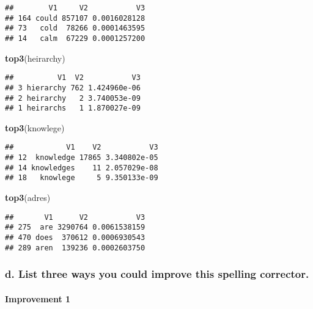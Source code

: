 \documentclass[]{article}
\newenvironment{Shaded}{\begin{snugshade}}{\end{snugshade}}
\newcommand{\KeywordTok}[1]{\textcolor[rgb]{0.13,0.29,0.53}{\textbf{#1}}}
\newcommand{\NormalTok}[1]{#1}
\let\oldparagraph\paragraph
\renewcommand{\paragraph}[1]{\oldparagraph{#1}\mbox{}}
\begin{document}
\begin{verbatim}
##        V1     V2           V3
## 164 could 857107 0.0016028128
## 73   cold  78266 0.0001463595
## 14   calm  67229 0.0001257200
\end{verbatim}

\begin{Shaded}
\begin{Highlighting}[]
\KeywordTok{top3}\NormalTok{(heirarchy)}
\end{Highlighting}
\end{Shaded}

\begin{verbatim}
##          V1  V2           V3
## 3 hierarchy 762 1.424960e-06
## 2 heirarchy   2 3.740053e-09
## 1 heirarchs   1 1.870027e-09
\end{verbatim}

\begin{Shaded}
\begin{Highlighting}[]
\KeywordTok{top3}\NormalTok{(knowlege)}
\end{Highlighting}
\end{Shaded}

\begin{verbatim}
##            V1    V2           V3
## 12  knowledge 17865 3.340802e-05
## 14 knowledges    11 2.057029e-08
## 18   knowlege     5 9.350133e-09
\end{verbatim}

\begin{Shaded}
\begin{Highlighting}[]
\KeywordTok{top3}\NormalTok{(adres)}
\end{Highlighting}
\end{Shaded}

\begin{verbatim}
##       V1      V2           V3
## 275  are 3290764 0.0061538159
## 470 does  370612 0.0006930543
## 289 aren  139236 0.0002603750
\end{verbatim}

\hypertarget{d.-list-three-ways-you-could-improve-this-spelling-corrector.}{%
\subsubsection{d. List three ways you could improve this spelling
corrector.}\label{d.-list-three-ways-you-could-improve-this-spelling-corrector.}}

\hypertarget{improvement-1}{%
\paragraph{Improvement 1}\label{improvement-1}}
\end{document}
